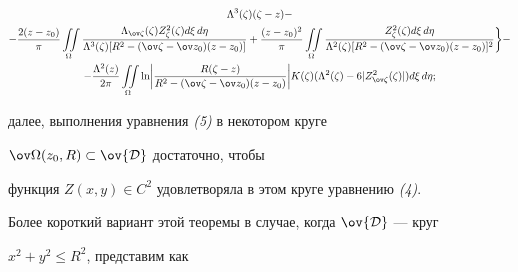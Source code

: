 \begin{thm}
\begin{multline}
{\Lambda^3(\zeta)(\zeta-z)}-\\ 


% 


-\frac{2(z-z_0)}{\pi}\iintl_\Omega 


\frac{\Lambda_{\ov\zeta}(\zeta)Z^2_\zeta(\zeta)d\xi\,d\eta} 


{\Lambda^3(\zeta)[R^2-(\ov\zeta-\ov z_0)(z-z_0)]} 


+\frac{(z-z_0)^2}{\pi}\iintl_\Omega 


\frac{Z^2_\zeta(\zeta)d\xi\,d\eta} 


{\Lambda^2(\zeta)[R^2-(\ov\zeta-\ov z_0)(z-z_0)]^2}\biggr\}- \\ 


% 


-\frac{\Lambda^2(z)}{2\pi}\iintl_\Omega\ln\biggl| 


\frac{R(\zeta-z)}{R^2-(\ov\zeta-\ov z_0)(z-z_0)}\biggr| 


K(\zeta)(\Lambda^2(\zeta)-6|Z^2_{\ov\zeta}(\zeta)|)d\xi\,d\eta; 


\end{multline} 


далее, выполнения уравнения {\em (5)} в некотором круге 


$\ov\Omega(z_0,R)\subset\ov{\cal D}$ достаточно, чтобы 


функция $Z(x,y)\in C^2$ удовлетворяла в этом круге уравнению {\em (4)}. 


\end{thm} 


 


Более короткий вариант этой теоремы в случае, когда $\ov{\cal D}$ --- круг 


$x^2+y^2\le R^2$, представим как 


 


